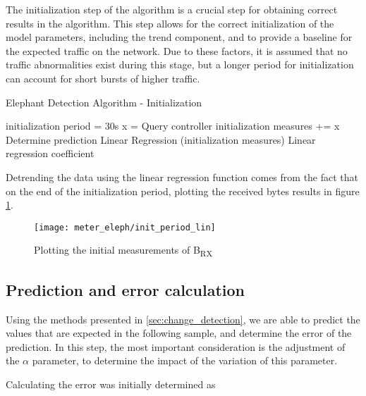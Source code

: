 The initialization step of the algorithm is a crucial step for obtaining correct results in the algorithm. This step allows for the correct initialization of the model parameters, including the trend component, and to provide a 
baseline for the expected traffic on the network. Due to these factors, it is assumed that no traffic abnormalities exist during this stage, but a longer period for initialization can account for short bursts of higher traffic.

\begin{algorithm}[H]
    \caption{Elephant Detection Algorithm - Initialization} \label{alg:high_level}
    \begin{algorithmic}[1]
            \State initialization period = 30s
                \State x = Query controller
                \State initialization measures += x
                \State Determine prediction
            \EndWhile
            \State Linear Regression (initialization measures)
        \State \Return Linear regression coefficient
    \end{algorithmic}
\end{algorithm}

\par Detrending the data using the linear regression function comes from the fact that on the end of the initialization period, plotting the received bytes results in figure \ref{fig:init_plot}.

\begin{figure} 
    \centering
    \texttt{[image: meter\_eleph/init\_period\_lin]}
    \caption {Plotting the initial measurements of B\textsubscript{RX}}
    \label{fig:init_plot}
\end{figure} 

\subsection{Prediction and error calculation}

Using the methods presented in \ref{sec:change_detection}, we are able to predict the values that are expected in the following sample, and determine the error of the prediction. In this step, the most important consideration is the adjustment of
the $\alpha$ parameter, to determine the impact of the variation of this parameter.

\par Calculating the error was initially determined as

